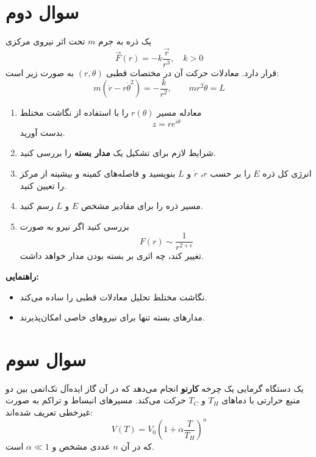 \documentclass[a4paper,16pt]{article}
\begin{document}
	
	\section{سوال دوم}
	
	یک ذره به جرم $m$ تحت اثر نیروی مرکزی
	\[
	\vec{F}(r) = -k \frac{\vec{r}}{r^3}, \quad k>0
	\]
	قرار دارد. معادلات حرکت آن در مختصات قطبی $(r,\theta)$ به صورت زیر است:
	\[
	m(\ddot{r} - r\dot{\theta}^2) = -\frac{k}{r^2}, \qquad
	m r^2 \dot{\theta} = L
	\]
	
	\begin{enumerate}
		\item معادله مسیر $r(\theta)$ را با استفاده از نگاشت مختلط
		\[
		z = r e^{i\theta}
		\]
		بدست آورید.
		
		\item شرایط لازم برای تشکیل یک \textbf{مدار بسته} را بررسی کنید.
		
		\item انرژی کل ذره $E$ را بر حسب $r$، $\dot r$ و $L$ بنویسید و فاصله‌های کمینه و بیشینه از مرکز را تعیین کنید.
		
		\item مسیر ذره را برای مقادیر مشخص $E$ و $L$ رسم کنید.
		
		\item بررسی کنید اگر نیرو به صورت
		\[
		F(r) \sim \frac{1}{r^{2+\epsilon}}
		\]
		تغییر کند، چه اثری بر بسته بودن مدار خواهد داشت.
	\end{enumerate}
	
	\textbf{راهنمایی:}
	\begin{itemize}
		\item نگاشت مختلط تحلیل معادلات قطبی را ساده می‌کند.
		\item مدارهای بسته تنها برای نیروهای خاصی امکان‌پذیرند.
	\end{itemize}
	
	
	
	\section{سوال سوم}
	
	یک دستگاه گرمایی یک چرخه \textbf{کارنو} انجام می‌دهد که در آن گاز ایده‌آل تک‌اتمی بین دو منبع حرارتی با دماهای
	$T_H$ و $T_C$
	حرکت می‌کند.  
	مسیرهای انبساط و تراکم به صورت غیرخطی تعریف شده‌اند:
	\[
	V(T) = V_0 \left(1 + \alpha \frac{T}{T_H}\right)^n
	\]
	که در آن $n$ عددی مشخص و $\alpha \ll 1$ است.
	
\end{document}
